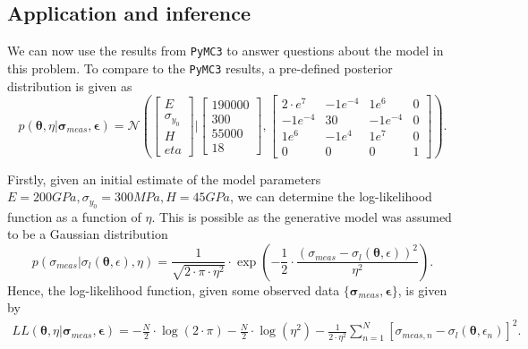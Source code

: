 \documentclass{article}
\begin{document}
	\subsection{Application and inference}
	
	We can now use the results from \texttt{PyMC3} to answer questions about the model in this problem. To compare to the \texttt{PyMC3} results, a pre-defined posterior distribution is given as
	\begin{equation}\label{eq:predefined_posterior}
		p(\boldsymbol\theta, \eta \vert \boldsymbol\sigma_{meas}, \boldsymbol\epsilon) = \mathcal{N} \left( 
		\begin{bmatrix}
			E \\
			\sigma_{y_0} \\
			H \\
			eta 
		\end{bmatrix} \vert
		\begin{bmatrix}
			190 000 \\
			300 \\
			55 000 \\
			18 
		\end{bmatrix},
		\begin{bmatrix}
			2\cdot e^{7} & -1e^{-4} & 1e^{6} & 0 \\
			-1e^{-4} & 30 & -1e^{-4} & 0 \\
			1e^{6} & -1e^{4} & 1e^{7} & 0 \\
			0 & 0 & 0 & 1
		\end{bmatrix}
		 \right).
	\end{equation}

	Firstly, given an initial estimate of the model parameters $E = 200 GPa, \sigma_{y_0} = 300 MPa, H = 45 GPa$, we can determine the log-likelihood function as a function of $\eta$. This is possible as the generative model was assumed to be a Gaussian distribution
	\begin{equation}
		p(\sigma_{meas} \vert \sigma_l(\boldsymbol\theta, \epsilon), \eta) = \frac{1}{\sqrt{2\cdot \pi \cdot \eta^2}} \cdot \exp \left( -\frac{1}{2}\cdot \frac{\left( \sigma_{meas} - \sigma_l(\boldsymbol\theta, \epsilon) \right)^2}{\eta^2} \right).
	\end{equation}
	Hence, the log-likelihood function, given some observed data $\{\boldsymbol\sigma_{meas}, \boldsymbol\epsilon\}$, is given by
	\begin{equation}
		\begin{aligned}
			LL(\boldsymbol\theta, \eta \vert \boldsymbol\sigma_{meas}, \boldsymbol\epsilon) = -\frac{N}{2}\cdot \log(2 \cdot \pi) - \frac{N}{2}\cdot \log(\eta^2) - \frac{1}{2\cdot \eta^2}\sum_{n=1}^{N} \left[ \sigma_{meas, n} - \sigma_l(\boldsymbol\theta, \epsilon_n) \right]^2.
		\end{aligned}
	\end{equation}
\end{document}
